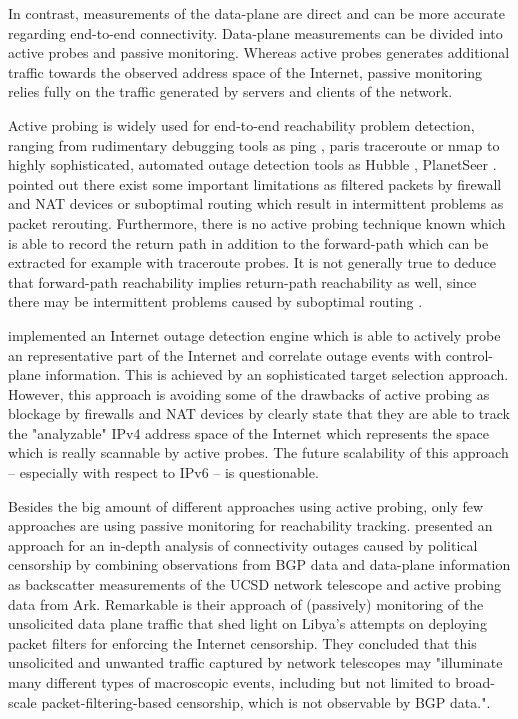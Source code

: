 In contrast, measurements of the data-plane are direct and can be more accurate
regarding end-to-end connectivity. Data-plane measurements can be divided into
active probes and passive monitoring. Whereas active probes generates additional
traffic towards the observed address space of the Internet, passive monitoring
relies fully on the traffic generated by servers and clients of the network.

Active probing is widely used for end-to-end reachability problem detection,
ranging from rudimentary debugging tools as ping \citep{PING}, paris traceroute
\citep{traceroute} or nmap \citep{Nmap} to highly sophisticated, automated
outage detection tools as Hubble \citep{Katz:2008}, PlanetSeer
\citep{Zhang:2004}. \citet{Bush:Optometry} pointed out there exist some
important limitations as filtered packets by firewall and NAT devices or
suboptimal routing which result in intermittent problems as packet rerouting.
Furthermore, there is no active probing technique known which is able to record
the return path in addition to the forward-path which can be extracted for
example with traceroute probes. It is not generally true to deduce that
forward-path reachability implies return-path reachability as well, since there
may be intermittent problems caused by suboptimal routing
\citep{Bush:Optometry}.

\citet{Quan12a} implemented an Internet outage detection engine which is able to
actively probe an representative part of the Internet and correlate outage
events with control-plane information. This is achieved by an sophisticated
target selection approach. However, this approach is avoiding some of the
drawbacks of active probing as blockage by firewalls and NAT devices by clearly
state that they are able to track the "analyzable" IPv4 address space of the
Internet which represents the space which is really scannable by active probes.
The future scalability of this approach -- especially with respect to IPv6 -- is
questionable. 

Besides the big amount of different approaches using active probing, only few
approaches are using passive monitoring for reachability tracking.
\citet{Dainotti:2011:ACI} presented an approach for an in-depth analysis of
connectivity outages caused by political censorship by combining observations
from BGP data and data-plane information as backscatter measurements of the UCSD
network telescope and active probing data from Ark. Remarkable is their approach
of (passively) monitoring of the unsolicited data plane traffic that shed light
on Libya's attempts on deploying packet filters for enforcing the Internet
censorship. They concluded that this unsolicited and unwanted traffic captured
by network telescopes may "illuminate many different types of macroscopic
events, including but not limited to broad-scale packet-filtering-based
censorship, which is not observable by BGP data."\citep{Dainotti:2011:ACI}.


